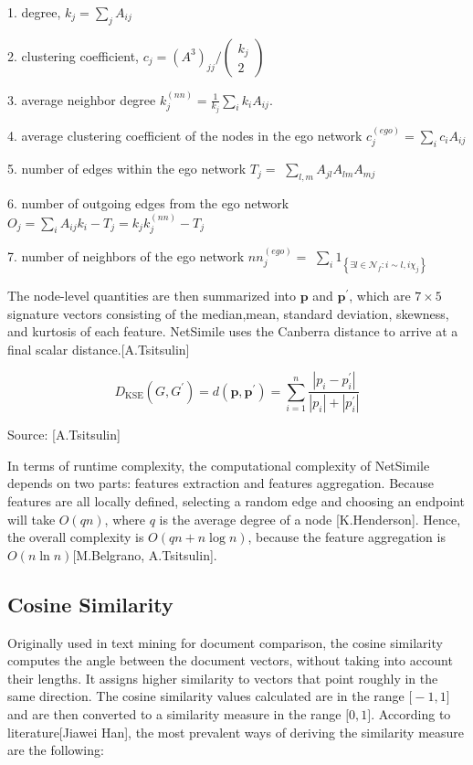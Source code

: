 1. degree, $k_{j}=\sum_{j} A_{i j}$

2. clustering coefficient, $c_{j}=\left(A^{3}\right)_{j j} /\left(\begin{array}{c}k_{j} \\ 2\end{array}\right)$

3. average neighbor degree $k_{j}^{(n n)}=\frac{1}{k_{j}} \sum_{i} k_{i} A_{i j}$.

4. average clustering coefficient of the nodes in the ego network $c_{j}^{(e g o)}=\sum_{i} c_{i} A_{i j}$

5. number of edges within the ego network $T_{j}=$ $\sum_{l, m} A_{j l} A_{l m} A_{m j}$

6. number of outgoing edges from the ego network $O_{j}=\sum_{i} A_{i j} k_{i}-T_{j}=k_{j} k_{j}^{(n n)}-T_{j}$

7. number of neighbors of the ego network $n n_{j}^{(e g o)}=$ $\sum_{i} 1_{\left\{\exists l \in \mathcal{N}_{f}: i \sim l, i \chi_{j}\right\}}$


The node-level quantities are then summarized into $\mathbf{p}$ and $\mathbf{p}^{\prime}$, which are $7 \times 5$ signature vectors consisting of the median,mean, standard deviation, skewness, and kurtosis of each feature. NetSimile uses the Canberra distance to arrive at a final scalar distance.[A.Tsitsulin]

\begin{equation}
D_{\mathrm{KSE}}\left(G, G^{\prime}\right)=d\left(\mathbf{p}, \mathbf{p}^{\prime}\right)=\sum_{i=1}^{n} \frac{\left|p_{i}-p_{i}^{\prime}\right|}{\left|p_{i}\right|+\left|p_{i}^{\prime}\right|}
\end{equation}
\caption{Source: [A.Tsitsulin]}

In terms of runtime complexity, the computational complexity of NetSimile depends on two parts: features extraction and features aggregation. Because features are all locally defined, selecting a random edge and choosing an endpoint will take $O(q n)$, where $q$ is the average degree of a node [K.Henderson]. Hence, the overall complexity is $O(q n+n \log n)$, because the feature aggregation is $O(n \ln n)$[M.Belgrano, A.Tsitsulin].

\subsection{Cosine Similarity}
Originally used in text mining for document comparison, the cosine similarity computes the angle between the document vectors, without taking into account their lengths. It assigns higher similarity to vectors that point roughly in the same direction. 
The cosine similarity values calculated are in the range $\mathrm[-1, 1]$ and are then converted to a similarity measure in the range $\mathrm[0, 1]$. According to literature[Jiawei Han], the most prevalent ways of deriving the similarity measure are the following:

